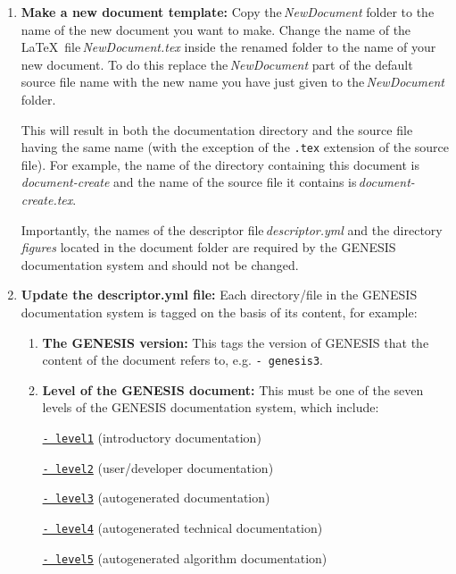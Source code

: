 \documentclass[12pt]{article}
\begin{document}
\begin{enumerate}

\item {\bf Make a new document template:} Copy the\,{\it NewDocument} folder to the name of the new document you want to make. Change the name of the \LaTeX\,\,\,file\,{\it NewDocument.tex} inside the renamed folder to the name of your new document. To do this replace the\,{\it NewDocument} part of the default source file name with the new name you have just given to the\,{\it NewDocument} folder.

This will result in both the documentation directory and the source file having the same name (with the exception of the {\tt .tex} extension of the source file). For example, the name of the directory containing this document is {\it document-create} and the name of the source file it contains is\,{\it document-create.tex}.

Importantly, the names of the descriptor file\,{\it descriptor.yml} and the directory\,{\it figures} located in the document folder are required by the GENESIS documentation system and should not be changed.

\item {\bf Update the descriptor.yml file:} Each directory/file in the GENESIS documentation system is tagged on the basis of its content, for example:

\begin{enumerate}

\item  {\bf The GENESIS version:} This tags the version of GENESIS that the content of the document refers to, e.g. {\tt -\,genesis3}.

\item {\bf Level of the GENESIS document:} This must be one of the seven levels of the GENESIS documentation system, which include:

\href{../contents-level1/contents-level1.pdf}{{\tt - level1}} (introductory documentation)

\href{../contents-level2/contents-level2.pdf}{{\tt - level2}} (user/developer documentation)

\href{../contents-level3/contents-level3.pdf}{{\tt - level3}} (autogenerated documentation)

\href{../contents-level4/contents-level4.pdf}{{\tt - level4}} (autogenerated technical documentation)

\href{../contents-level5/contents-level5.pdf}{{\tt - level5}} (autogenerated algorithm documentation)


\end{enumerate}
\end{enumerate}
\end{document}

